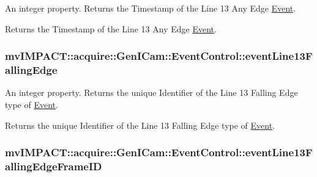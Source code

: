 An integer property. Returns the Timestamp of the Line 13 Any Edge \hyperlink{classmv_i_m_p_a_c_t_1_1acquire_1_1_event}{Event}. 

Returns the Timestamp of the Line 13 Any Edge \hyperlink{classmv_i_m_p_a_c_t_1_1acquire_1_1_event}{Event}. \hypertarget{classmv_i_m_p_a_c_t_1_1acquire_1_1_gen_i_cam_1_1_event_control_a96af8b7f0e7c024747c416b03c4b88e9}{
\subsubsection[{event\+Line13\+Falling\+Edge}]{ mv\+I\+M\+P\+A\+C\+T\+::acquire\+::\+Gen\+I\+Cam\+::\+Event\+Control\+::event\+Line13\+Falling\+Edge}}\label{classmv_i_m_p_a_c_t_1_1acquire_1_1_gen_i_cam_1_1_event_control_a96af8b7f0e7c024747c416b03c4b88e9}


An integer property. Returns the unique Identifier of the Line 13 Falling Edge type of \hyperlink{classmv_i_m_p_a_c_t_1_1acquire_1_1_event}{Event}. 

Returns the unique Identifier of the Line 13 Falling Edge type of \hyperlink{classmv_i_m_p_a_c_t_1_1acquire_1_1_event}{Event}. \hypertarget{classmv_i_m_p_a_c_t_1_1acquire_1_1_gen_i_cam_1_1_event_control_a96bb99b035c2888db3514dced832269a}{
\subsubsection[{event\+Line13\+Falling\+Edge\+Frame\+I\+D}]{ mv\+I\+M\+P\+A\+C\+T\+::acquire\+::\+Gen\+I\+Cam\+::\+Event\+Control\+::event\+Line13\+Falling\+Edge\+Frame\+I\+D}}\label{classmv_i_m_p_a_c_t_1_1acquire_1_1_gen_i_cam_1_1_event_control_a96bb99b035c2888db3514dced832269a}


